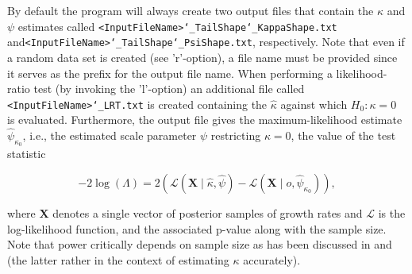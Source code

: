 \documentclass[12pt,a4paper]{scrartcl}
\begin{document}
By default the program will always create two output files that contain the $\kappa$ and $\psi$ estimates called \texttt{<InputFileName>\char`_TailShape\char`_KappaShape.txt} and\newline \texttt{<InputFileName>\char`_TailShape\char`_PsiShape.txt}, respectively. Note that even if a random data set is created (see 'r'-option), a file name must be provided since it serves as the prefix for the output file name.
When performing a likelihood-ratio test (by invoking the 'l'-option) an additional file called \texttt{<InputFileName>\char`_LRT.txt} is created containing the $\hat{\kappa}$ against which $H_0: \kappa=0$ is evaluated. Furthermore, the output file gives the maximum-likelihood estimate $\hat{\psi}_{\kappa_0}$, i.e., the estimated scale parameter $\psi$ restricting $\kappa=0$, the value of the test statistic

\begin{equation}
-2\log(\Lambda)=2(\mathcal{L}(\mathbf{X}\mid \hat{\kappa}, \hat{\psi})-\mathcal{L}(\mathbf{X}\mid o, \hat{\psi}_{\kappa_0})),
\end{equation}

where $\mathbf{X}$ denotes a single vector of posterior samples of growth rates and $\mathcal{L}$ is the log-likelihood function, and the associated p-value along with the sample size.
Note that power critically depends on sample size as has been discussed in \cite{BeiRW07} and \cite{CasS15} (the latter rather in the context of estimating $\kappa$ accurately).

\clearpage
 

 
\end{document}
